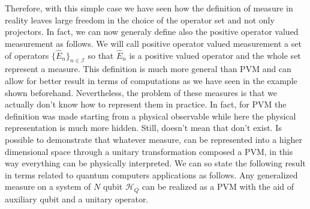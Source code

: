 Therefore, with this simple case we have seen how the definition of measure in reality leaves large freedom in the choice of the operator set and not only projectors. In fact, we can now generaly define also the positive operator valued measurement as follows.
{
    We will call positive operator valued measurement a set of operators $\{ \hat{E}_n \}_{n\in\mathcal{I}}$ so that $\hat{E}_n$ is a positive valued operator and the whole set represent a measure.
}
\noindent
This definition is much more general than PVM and can allow for better result in terms of computations as we have seen in the example shown beforehand. Nevertheless, the problem of these measures is that we actually don't know how to represent them in practice. In fact, for PVM the definition was made starting from a physical observable while here the physical representation is much more hidden. Still, doesn't mean that don't exist. Is possible to demonstrate that whatever measure, can be represented into a higher dimensional space through a unitary transformation composed a PVM, in this way everything can be physically interpreted. We can so state the following result in terms related to quantum computers applications as follows.
{
    Any generalized measure on a system of $N$ qubit $\mathcal{H}_Q$ can be realized as a PVM with the aid of auxiliary qubit and a unitary operator.
}
